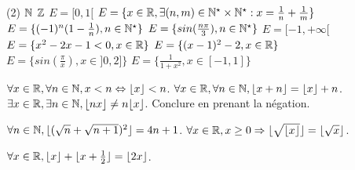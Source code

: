 \begin{exercise}[subtitle= Études des bornes d'ensembles]

	\begin{tasks}(2)
		\task $\mathbb{N}$
		\task $\mathbb{Z}$
		\task $E = [0,1[$
		\task $E = \{ x \in \mathbb{R}, \exists (n,m) \in \mathbb{N}^\star \times \mathbb{N}^\star : x=\frac{1}{n} + \frac{1}{m} \}$
		\task $E = \{(-1)^n(1-\frac{1}{n}), n \in \mathbb{N}^\star \}$
		\task $E = \{sin(\frac{n \pi}{3}), n \in \mathbb{N}^\star \}$
		\task $E = [-1,+\infty[$
		\task $E = \{x^2 - 2x -1 <0, x \in \mathbb{R} \}$
		\task $E = \{(x-1)^2-2, x \in \mathbb{R} \}$
		\task $E = \{sin(\frac{\pi}{x}), x \in ]0,2] \}$
		\task $E = \{\frac{1}{1+x^2}, x \in [-1,1] \}$
	\end{tasks}
\end{exercise}


\begin{exercise}[subtitle= Propriétés de la fonction partie entière, difficulty=*]
	\begin{tasks}
		\task  \Mq  $\forall x \in \mathbb{R}, \forall n \in \mathbb{N}, x <n \Leftrightarrow \lfloor x \rfloor < n$.
		\task \Mq $\forall x \in \mathbb{R}, \forall n \in \mathbb{N}, \lfloor x + n \rfloor = \lfloor x \rfloor +n$.
		\task \Mq $\exists x \in \mathbb{R}, \exists n \in \mathbb{N}, \lfloor nx \rfloor \neq n \lfloor x \rfloor$. Conclure en prenant la négation. 
	\end{tasks}
\end{exercise}

\begin{exercise}[subtitle= Racine carrée et  partie entière, difficulty=*]
		\begin{tasks}
			\task \Mq $\forall n \in \mathbb{N}, \lfloor ( \sqrt{n} + \sqrt{n+1})^2 \rfloor = 4n +1$.
 			\task \Mq  $\forall x \in \mathbb{R}, x \ge 0 \Rightarrow \lfloor \sqrt{\lfloor x \rfloor}\rfloor = \lfloor \sqrt{x} \rfloor$.
 	\end{tasks}
\end{exercise}

\begin{exercise}[subtitle= Partie entière et disjonction des cas, difficulty=*]
	\begin{tasks}
		\task \Mq $\forall x \in \mathbb{R}, \lfloor x \rfloor + \lfloor x + \frac{1}{2} \rfloor = \lfloor 2 x \rfloor$.
	\end{tasks}
\end{exercise}


